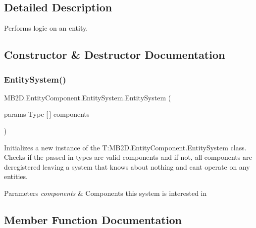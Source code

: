 \subsection{Detailed Description}
Performs logic on an entity. 



\subsection{Constructor \& Destructor Documentation}
\hypertarget{class_m_b2_d_1_1_entity_component_1_1_entity_system_abc7175246313b23db881d09da586428a}{}\label{class_m_b2_d_1_1_entity_component_1_1_entity_system_abc7175246313b23db881d09da586428a} 
\subsubsection{\texorpdfstring{Entity\+System()}{EntitySystem()}}
{\footnotesize\ttfamily M\+B2\+D.\+Entity\+Component.\+Entity\+System.\+Entity\+System (\begin{DoxyParamCaption}\item[{params Type \mbox{[}$\,$\mbox{]}}]{components }\end{DoxyParamCaption})\hspace{0.3cm}{\ttfamily [inline]}}



Initializes a new instance of the T\+:\+M\+B2\+D.\+Entity\+Component.\+Entity\+System class. Checks if the passed in types are valid components and if not, all components are deregistered leaving a system that knows about nothing and can\textquotesingle{}t operate on any entities. 


\begin{DoxyParams}{Parameters}
{\em components} & Components this system is interested in\\
\hline
\end{DoxyParams}


\subsection{Member Function Documentation}
\hypertarget{class_m_b2_d_1_1_entity_component_1_1_entity_system_aaf18ceb985015ddbff4a361a3b1de5bb}{}\label{class_m_b2_d_1_1_entity_component_1_1_entity_system_aaf18ceb985015ddbff4a361a3b1de5bb} 
